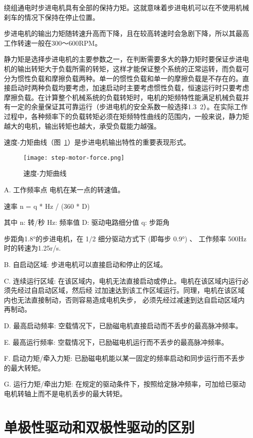绕组通电时步进电机具有全部的保持力矩。这就意味着步进电机可以在不使用机械刹车的情况下保持在停止位置。

步进电机的输出力矩随转速升高而下降，且在较高转速时会急剧下降，所以其最高工作转速一般在300～600RPM。

静力矩是选择步进电机的主要参数之一，在判断需要多大的静力矩时要保证步进电机的输出转矩大于负载所需的转矩，这样才能保证整个系统的正常运转，而负载可分为惯性负载和摩擦负载两种。单一的惯性负载和单一的摩擦负载是不存在的。直接启动时两种负载均要考虑，加速启动时主要考虑惯性负载，恒速运行时只要考虑摩擦负载。在计算整个机械系统的负载转矩时，电机的矩频特性能满足机械负载并有一定的余量保证其可靠运行（步进电机的安全系数一般选择1.3~2）。在实际工作过程中，各种频率下的负载转矩必须在矩频特性曲线的范围内，一般来说，静力矩越大的电机，输出转矩也越大，承受负载能力越强。

速度-力矩曲线（图~\ref{fig:step-motor-force}）是步进电机输出特性的重要表现形式。

\begin{figure}[htbp]
    \centering
    \texttt{[image: step-motor-force.png]}
    \caption{速度-力矩曲线}
    \label{fig:step-motor-force}
\end{figure}

A. 工作频率点 电机在某一点的转速值。

速率 n = q * Hz / (360 * D)

其中 n: 转/秒 Hz: 频率值 D: 驱动电路细分值 q: 步距角

步距角1.8°的步进电机，在 1/2 细分驱动方式下 (即每步 0.9°) 、 工作频率 500Hz 时的转速为1.25r/s.

B. 自启动区域: 步进电机可以直接启动和停止的区域。

C. 连续运行区域: 在该区域内，电机无法直接启动或停止。电机在该区域内运行必须先经过自启动区域，然后经 过加速达到该工作区域运行。同理，电机在该区域内也无法直接制动，否则容易造成电机失步， 必须先经过减速到达自启动区域内再制动。

D. 最高启动频率: 空载情况下，已励磁电机直接启动而不丢步的最高脉冲频率。

E. 最高运行频率: 空载情况下，已励磁电机运行而不丢步的最高脉冲频率。

F. 启动力矩/牵入力矩: 已励磁电机能以某一固定的频率启动和同步运行而不丢步的最大转矩。

G. 运行力矩/牵出力矩: 在规定的驱动条件下，按照给定脉冲频率，可加给已驱动电机转轴上而不是电机丢步的最大转矩。

\section{单极性驱动和双极性驱动的区别}

